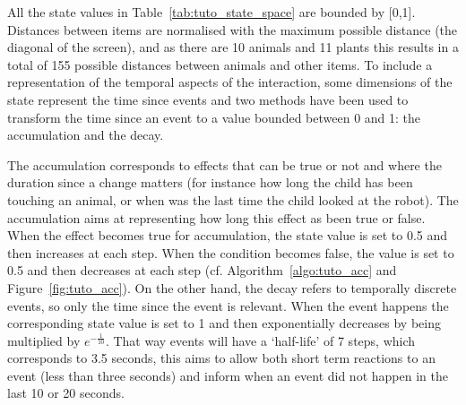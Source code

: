 All the state values in Table~\ref{tab:tuto_state_space} are bounded by [0,1]. Distances between items are normalised with the maximum possible distance (the diagonal of the screen), and as there are 10 animals and 11 plants this results in a total of 155 possible distances between animals and other items. To include a representation of the temporal aspects of the interaction, some dimensions of the state represent the time since events and two methods have been used to transform the time since an event to a value bounded between 0 and 1: the accumulation and the decay.

The accumulation corresponds to effects that can be true or not and where the duration since a change matters (for instance how long the child has been touching an animal, or when was the last time the child looked at the robot). The accumulation aims at representing how long this effect as been true or false. When the effect becomes true for accumulation, the state value is set to 0.5 and then increases at each step. When the condition becomes false, the value is set to 0.5 and then decreases at each step (cf. Algorithm~\ref{algo:tuto_acc} and Figure~\ref{fig:tuto_acc}). On the other hand, the decay refers to temporally discrete events, so only the time since the event is relevant. When the event happens the corresponding state value is set to 1 and then exponentially decreases by being multiplied by $e^{-\frac{1}{10}}$. That way events will have a `half-life' of 7 steps, which corresponds to 3.5 seconds, this aims to allow both short term reactions to an event (less than three seconds) and inform when an event did not happen in the last 10 or 20 seconds.


